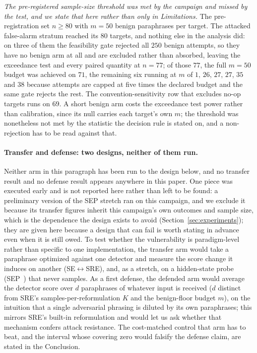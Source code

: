 \emph{The pre-registered sample-size threshold was met by the campaign and missed by the
test, and we state that here rather than only in Limitations.} The pre-registration set
$n{\geq}80$ with $m{=}50$ benign paraphrases per target. The attacked false-alarm stratum
reached its $80$ targets, and nothing else in the analysis did: on three of them the
feasibility gate rejected all $250$ benign attempts, so they have no benign arm at all and
are excluded rather than absorbed, leaving the exceedance test and every paired quantity at
$n{=}77$; of those $77$, the full $m{=}50$ budget was achieved on $71$, the remaining six
running at $m$ of $1$, $26$, $27$, $27$, $35$ and $38$ because attempts are capped at five
times the declared budget and the same gate rejects the rest. The convention-sensitivity row
that excludes no-op targets runs on $69$. A short benign
arm costs the exceedance test power rather than calibration, since its null carries each
target's own $m$; the threshold was nonetheless not met by the statistic the decision rule is
stated on, and a non-rejection has to be read against that.

\paragraph{Transfer and defense: two designs, neither of them run.}
Neither arm in this paragraph has been run to the design below, and no transfer result
and no defense result appears anywhere in this paper. One piece was executed early and is
not reported here rather than left to be found: a preliminary version of the SEP stretch ran
on this campaign, and we exclude it because its transfer figures inherit this campaign's own
outcomes and sample size, which is the dependence the design exists to avoid
(Section~\ref{sec:experiments}); they are given here because a design that can fail is
worth stating in advance even when it is still owed. To test whether the vulnerability is
paradigm-level rather than specific to one
implementation, the transfer arm would take a paraphrase optimized against one detector and
measure the
score change it induces on another (SE$\leftrightarrow$SRE), and, as a stretch,
on a hidden-state probe (SEP~\citep{kossen2024seps}) that never samples. As a
first defense, the defended arm would average the detector score over $d$ paraphrases of
whatever
input is received ($d$ distinct from SRE's samples-per-reformulation $K$ and the
benign-floor budget $m$), on the intuition that a single adversarial phrasing is diluted
by its own paraphrases; this mirrors SRE's built-in reformulation and would let us ask
whether that mechanism confers attack resistance. The cost-matched control that arm has to
beat, and the interval whose covering zero would falsify the defense claim, are stated in
the Conclusion.
